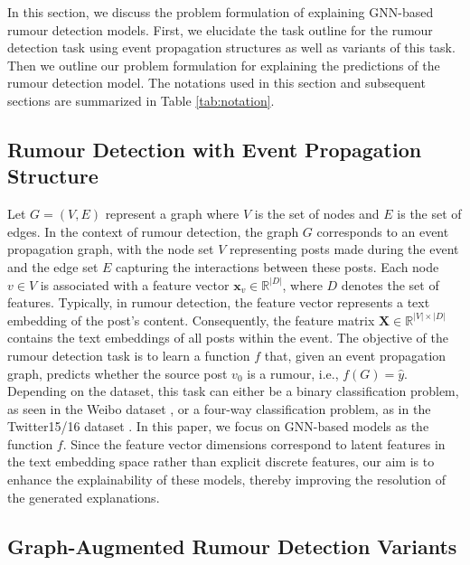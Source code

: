In this section, we discuss the problem formulation of explaining GNN-based rumour detection models. First, we elucidate the task outline for the rumour detection task using event propagation structures as well as variants of this task. Then we outline our problem formulation for explaining the predictions of the rumour detection model. The notations used in this section and subsequent sections are summarized in Table \ref{tab:notation}.

\subsection{Rumour Detection with Event Propagation Structure}

Let $G = (V, E)$ represent a graph where $V$ is the set of nodes and $E$ is the set of edges. In the context of rumour detection, the graph $G$ corresponds to an event propagation graph, with the node set $V$ representing posts made during the event and the edge set $E$ capturing the interactions between these posts. Each node $v \in V$ is associated with a feature vector $\textbf{x}_v \in \mathbb{R}^{|D|}$, where $D$ denotes the set of features. Typically, in rumour detection, the feature vector represents a text embedding of the post's content. Consequently, the feature matrix $\textbf{X} \in \mathbb{R}^{|V| \times |D|}$ contains the text embeddings of all posts within the event. The objective of the rumour detection task is to learn a function $f$ that, given an event propagation graph, predicts whether the source post $v_0$ is a rumour, i.e., $f(G) = \hat{y}$. Depending on the dataset, this task can either be a binary classification problem, as seen in the Weibo dataset \cite{ma2016detecting}, or a four-way classification problem, as in the Twitter15/16 dataset \cite{ma2016detecting}. In this paper, we focus on GNN-based models as the function $f$. Since the feature vector dimensions correspond to latent features in the text embedding space rather than explicit discrete features, our aim is to enhance the explainability of these models, thereby improving the resolution of the generated explanations.


\subsection{Graph-Augmented Rumour Detection Variants} 

